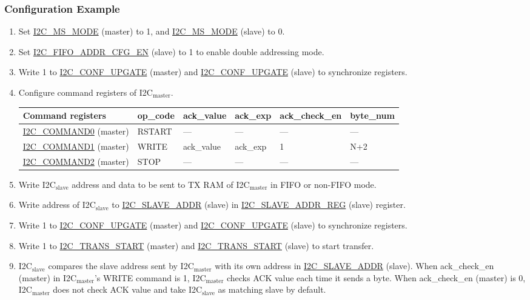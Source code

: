 \documentclass[main\_\_EN.tex]{subfiles}
\begin{document}
\subsubsection{Configuration Example}
\begin{enumerate}
\item Set \hyperref[fielddesc:I2CMSMODE]{I2C\_MS\_MODE} (master) to 1, and \hyperref[fielddesc:I2CMSMODE]{I2C\_MS\_MODE} (slave) to 0.
\item Set \hyperref[fielddesc:I2CFIFOADDRCFGEN]{I2C\_FIFO\_ADDR\_CFG\_EN} (slave) to 1 to enable double addressing mode.
\item Write 1 to \hyperref[fielddesc:I2CCONFUPGATE]{I2C\_CONF\_UPGATE} (master) and \hyperref[fielddesc:I2CCONFUPGATE]{I2C\_CONF\_UPGATE} (slave) to synchronize registers.
\item Configure command registers of I2C$_\text{master}$.
\begin{longtable}{ | p{4cm} | p{2cm} | p{2cm} | p{2cm} |p{2cm} | p{2cm} |}
\hline\rowcolor{lightgray}
Command registers& op\_code & ack\_value&ack\_exp&ack\_check\_en&byte\_num  \\ \hline
\hyperref[fielddesc:I2CCOMMAND0]{I2C\_COMMAND0} (master)& RSTART& ---&---&---&---  \\ \hline
\hyperref[fielddesc:I2CCOMMAND1]{I2C\_COMMAND1} (master)& WRITE& ack\_value&ack\_exp&1&N+2  \\ \hline
\hyperref[fielddesc:I2CCOMMAND2]{I2C\_COMMAND2} (master)& STOP& ---&---&---&---  \\ \hline
\end{longtable}
\item Write I2C$_\text{slave}$ address and data to be sent to TX RAM of I2C$_\text{master}$ in FIFO or non-FIFO mode.
\item Write address of I2C$_\text{slave}$ to \hyperref[fielddesc:I2CSLAVEADDR]{I2C\_SLAVE\_ADDR} (slave) in \hyperref[regdesc:I2CSLAVEADDRREG]{I2C\_SLAVE\_ADDR\_REG} (slave) register.
\item Write 1 to \hyperref[fielddesc:I2CCONFUPGATE]{I2C\_CONF\_UPGATE} (master) and \hyperref[fielddesc:I2CCONFUPGATE]{I2C\_CONF\_UPGATE} (slave) to synchronize registers.
\item Write 1 to \hyperref[fielddesc:I2CTRANSSTART]{I2C\_TRANS\_START} (master) and \hyperref[fielddesc:I2CTRANSSTART]{I2C\_TRANS\_START} (slave) to start transfer.
\item I2C$_\text{slave}$ compares the slave address sent by I2C$_\text{master}$ with its own address in \hyperref[fielddesc:I2CSLAVEADDR]{I2C\_SLAVE\_ADDR} (slave). When ack\_check\_en (master) in I2C$_\text{master}$'s WRITE command is 1, I2C$_\text{master}$ checks ACK value each time it sends a byte. When ack\_check\_en (master) is 0, I2C$_\text{master}$ does not check ACK value and take I2C$_\text{slave}$ as matching slave by default.

\end{enumerate}
\end{document}
